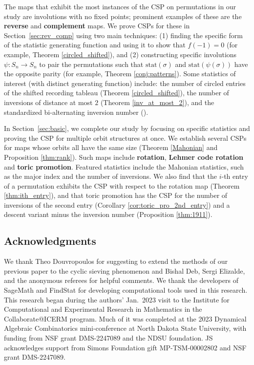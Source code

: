 \documentclass{amsart}
\theoremstyle{definition}
\begin{document}
The maps that exhibit the most instances of the CSP on permutations in our study are involutions with no fixed points; prominent examples of these are the \textbf{reverse} and \textbf{complement} maps. 
We prove CSPs for these in Section~\ref{sec:rev_comp} using two main techniques: (1) finding the specific form of the statistic generating function and  using it to show that $f(-1)=0$ (for example, Theorem \ref{circled_shifted}), and (2) constructing specific involutions $\psi:S_n \rightarrow S_n$ to pair the permutations such that $\text{stat}(\sigma)$ and $\text{stat}(\psi(\sigma))$ have the opposite parity (for example, Theorem \ref{conj:patterns}).
Some statistics of interest (with distinct generating function) include:
the number of circled entries of the shifted recording tableau (Theorem \ref{circled_shifted}), 
 the number of inversions of distance at most $2$ (Theorem \ref{inv_at_most_2}),  
and the standardized bi-alternating inversion number ().


In Section~\ref{sec:basic}, we complete our study by focusing on specific statistics and proving the CSP for multiple orbit structures at once. 
We establish several CSPs for maps whose orbits all have the same size 
(Theorem \ref{Mahonian} and Proposition
\ref{thm:rank}). Such maps include  \textbf{rotation}, \textbf{Lehmer code rotation} and \textbf{toric promotion}.  Featured statistics include the Mahonian statistics, such as the major index and the number of inversions. We also find that the $i$-th entry of a permutation exhibits the CSP with respect to the rotation map (Theorem \ref{thm:ith_entry}), and that toric promotion has the CSP for the number of inversions of the second entry (Corollary \ref{cor:toric_pro_2nd_entry}) and a descent variant minus the inversion number (Proposition \ref{thm:1911}). 


\subsection*{Acknowledgments} We thank Theo Douvropoulos for suggesting to extend the methods of our previous paper \cite{ELMSW22} to the cyclic sieving phenomenon and Bishal Deb, Sergi Elizalde, and the anonymous referees for helpful comments. We thank the developers of SageMath and FindStat for developing computational tools used in this research. This research began during the authors' Jan.\ 2023 visit to the Institute for Computational and Experimental Research in Mathematics in the Collaborate@ICERM program. Much of it was completed at the 2023 Dynamical Algebraic Combinatorics mini-conference at North Dakota State University, with funding from NSF grant DMS-2247089 and the NDSU foundation. JS acknowledges support from Simons Foundation gift MP-TSM-00002802 and NSF grant DMS-2247089.
\end{document}
